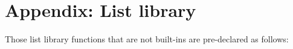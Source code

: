 \section*{Appendix: List library}

Those list library functions that are not built-ins are pre-declared as follows:




